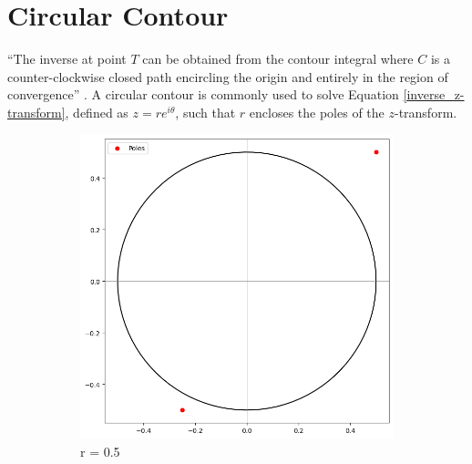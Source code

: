 \documentclass[a4paper]{report}
\begin{document}
\section{Circular Contour}
``The inverse at point $T$ can be obtained from the contour integral where $C$ is a counter-clockwise closed path encircling the origin and entirely in the region of convergence'' \citep{horvath2020numerical}. A circular contour is commonly used to solve Equation \ref{inverse_z-transform}, defined as $z = re^{i\theta}$, such that $r$ encloses the poles of the $z$-transform. 

\begin{figure}[H]
    \begin{subfigure}{.25\linewidth}
      \includegraphics[width=\linewidth]{images/invalid_contour.png}
      \caption{r = 0.5}
    \end{subfigure}\hfill
    \begin{subfigure}{.25\linewidth}

\end{subfigure}
\end{figure}
\end{document}
